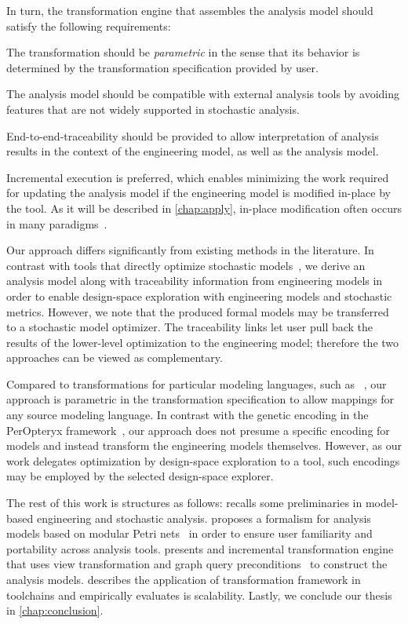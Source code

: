 In turn, the transformation engine that assembles the analysis model should satisfy the following requirements:
\begin{enumerate*}
\item The transformation should be \emph{parametric} in the sense that its behavior is determined by the transformation specification provided by user.
\item The analysis model should be compatible with external analysis tools by avoiding features that are not widely supported in stochastic analysis.
\item End-to-end-traceability should be provided to allow interpretation of analysis results in the context of the engineering model, as well as the analysis model.
\item Incremental execution is preferred, which enables minimizing the work required for updating the analysis model if the engineering model is modified in-place by the  tool. As it will be described in \cref{chap:apply}, in-place modification often occurs in many  paradigms~\citep{Vanherpen14patterns}.
\end{enumerate*}

Our approach differs significantly from existing methods in the literature. In contrast with tools that directly optimize stochastic models~, we derive an analysis model along with traceability information from engineering models in order to enable design-space exploration with engineering models and stochastic metrics. However, we note that the produced formal models may be transferred to a stochastic model optimizer. The traceability links let user pull back the results of the lower-level optimization to the engineering model; therefore the two approaches can be viewed as complementary.

Compared to transformations for particular modeling languages, such as ~, our approach is parametric in the transformation specification to allow mappings for any source modeling language. In contrast with the genetic encoding in the PerOpteryx framework~\citep{Koziolek11generic}, our approach does not presume a specific encoding for models and instead transform the engineering models themselves. However, as our work delegates optimization by design-space exploration to a  tool, such encodings may be employed by the selected design-space explorer.

The rest of this work is structures as follows:  recalls some preliminaries in model-based engineering and stochastic analysis.  proposes a formalism for analysis models based on modular Petri nets~\citep{Kindler09modular} in order to ensure user familiarity and portability across analysis tools.  presents and incremental transformation engine that uses view transformation and graph query preconditions~\citep{Debreceni14viewmodel} to construct the analysis models.  describes the application of transformation framework in  toolchains and empirically evaluates is scalability. Lastly, we conclude our thesis in \cref{chap:conclusion}.

